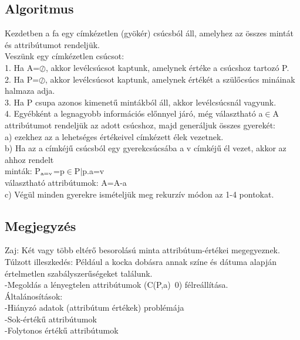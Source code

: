 \documentclass{article}
\begin{document}
	 \subsection{Algoritmus}
	 Kezdetben a fa egy címkézetlen (gyökér) csúcsból áll, amelyhez az összes mintát és attribútumot rendeljük.\\
	 Veszünk egy címkézetlen csúcsot:\\
	 1. Ha A=$\oslash$, akkor levélcsúcsot kaptunk, amelynek értéke a csúcshoz tartozó P.\\
	 2. Ha P=$\oslash$, akkor levélcsúcsot kaptunk, amelynek értékét a szülőcsúcs mináinak halmaza adja.\\
	 3. Ha P csupa azonos kimenetű mintákból áll, akkor levélcsúcsnál vagyunk.\\
	 4. Egyébként a legnagyobb információs előnnyel járó, még választható a$\in$A attribútumot rendeljük az adott csúcshoz, majd generáljuk összes gyerekét: \\
	 a) ezekhez az a lehetséges értékeivel címkézett élek vezetnek.\\
	 b) Ha az a címkéjű csúcsból egy gyerekcsúcsába a v címkéjű él vezet, akkor az ahhoz rendelt\\
	 minták: P$\textsubscript{a=v}$={p$\in$P$|$p.a=v}\\
	 választható attribútumok: A=A-{a}\\
	 c) Végül minden gyerekre ismételjük meg rekurzív módon az 1-4 pontokat.\\
	 
	 \subsection{Megjegyzés}
	 Zaj: Két vagy több eltérő besorolású minta attribútum-értékei megegyeznek.\\
	 Túlzott illeszkedés: Például a kocka dobásra annak színe és dátuma alapján értelmetlen szabályszerűségeket találunk.\\
	 -Megoldás a lényegtelen attribútumok (C(P,a)~0) félreállítása.\\
	 Általánosítások:\\
	 -Hiányzó adatok (attribútum értékek) problémája\\
	 -Sok-értékű attribútumok\\
	 -Folytonos értékű attribútumok
	 
	 \newpage
\end{document}
